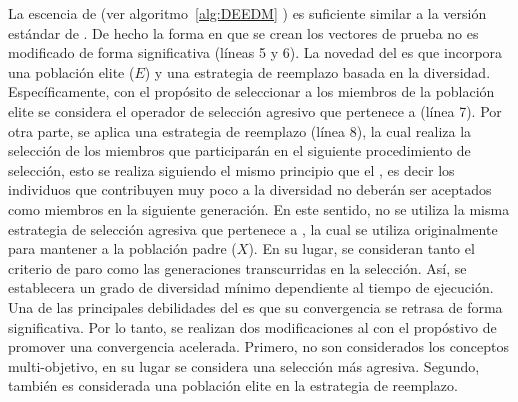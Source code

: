 La escencia de \DEEDM{} (ver algoritmo~\ref{alg:DEEDM} ) es suficiente similar a la versión estándar de \DE{}.
%
De hecho la forma en que se crean los vectores de prueba no es modificado de forma significativa (líneas 5 y 6).
%
La novedad del \DEEDM{} es que incorpora una población elite ($E$) y una estrategia de reemplazo basada en la diversidad.
%
Específicamente, con el propósito de seleccionar a los miembros de la población elite se considera el operador de selección agresivo que pertenece a \DE{} (línea 7).
%
Por otra parte, se aplica una estrategia de reemplazo (línea 8), la cual realiza la selección de los miembros que participarán en el siguiente procedimiento de selección, esto se realiza siguiendo el mismo principio que el \RMDDC{}, es decir los individuos que contribuyen muy poco a la diversidad no deberán ser aceptados como miembros en la siguiente generación.
%
En este sentido, no se utiliza la misma estrategia de selección agresiva que pertenece a \DE{}, la cual se utiliza originalmente para mantener a la población padre ($X$).
%
En su lugar, se consideran tanto el criterio de paro como las generaciones transcurridas en la selección.
%
Así, se establecera un grado de diversidad mínimo dependiente al tiempo de ejecución.
%
Una de las principales debilidades del \RMDDC{} es que su convergencia se retrasa de forma significativa.
%
Por lo tanto, se realizan dos modificaciones al \RMDDC{} con el propóstivo de promover una convergencia acelerada.
%
Primero, no son considerados los conceptos multi-objetivo, en su lugar se considera una selección más agresiva.
%
Segundo, también es considerada una población elite en la estrategia de reemplazo.

